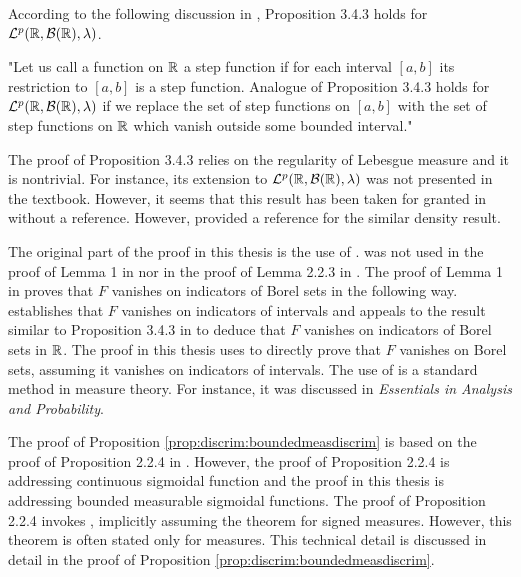 \begin{remark}
According to the following discussion in \cite{cohn_2013_measure}, Proposition 3.4.3 holds for  ${\mathcal {L}^p}({\mathbb R}, {\mathcal B}({\mathbb R}), \lambda)$.
\begin{displayquote}
"Let us call a function on ${\mathbb R}$ a step function if for each interval $[a,b]$ its restriction to $[a,b]$ is a step function.
Analogue of Proposition 3.4.3 holds for ${\mathcal {L}^p}({\mathbb R}, {\mathcal B}({\mathbb R}), \lambda)$ if we replace the set of step functions on $[a,b]$ with the set of step functions on ${\mathbb R}$ which vanish outside some bounded interval."
\end{displayquote}
The proof of Proposition 3.4.3 relies on the regularity of Lebesgue measure and it is nontrivial. For instance, its extension to ${\mathcal {L}^p}({\mathbb R}, {\mathcal B}({\mathbb R}), \lambda)$ was not presented in the textbook. However, it seems that this result has been taken for granted in \cite{calin_2020_deep} without a reference. However, \cite{cybenko_1989_approximation} provided a reference for the similar density result.
\end{remark}

The original part of the proof in this thesis is the use of .  was not used in the proof of Lemma 1 in  \cite{cybenko_1989_approximation} nor in the proof of Lemma 2.2.3 in \cite{calin_2020_deep}. The proof of Lemma 1 in \cite{cybenko_1989_approximation} proves that $F$ vanishes on indicators of Borel sets in the following way. \cite{cybenko_1989_approximation} establishes that $F$ vanishes on indicators of intervals and appeals to the result similar to Proposition 3.4.3 in \cite{cohn_2013_measure} to deduce that $F$ vanishes on indicators of Borel sets in ${\mathbb R}$. The proof in this thesis uses   to directly prove that $F$ vanishes on Borel sets, assuming it vanishes on indicators of intervals. The use of  is a standard method in measure theory. For instance, it was discussed in \textit{Essentials in Analysis and Probability}.

The proof of Proposition \ref{prop:discrim:boundedmeasdiscrim} is based on the proof of Proposition 2.2.4 in \cite{calin_2020_deep}. 
However, the proof of Proposition 2.2.4 is addressing continuous sigmoidal function and the proof in this thesis is addressing bounded measurable sigmoidal functions. The proof of Proposition 2.2.4 invokes , implicitly assuming the theorem for signed measures. However, this theorem is often stated only for measures. This technical detail is discussed in detail in the proof of Proposition \ref{prop:discrim:boundedmeasdiscrim}. 

